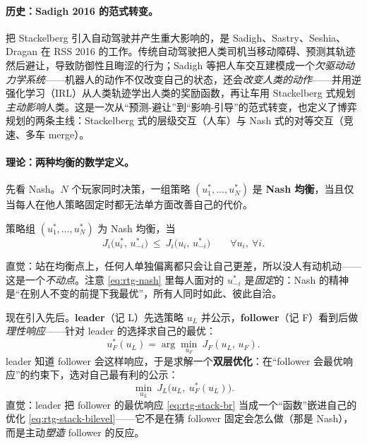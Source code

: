 \paragraph{历史：Sadigh 2016 的范式转变。}
把 Stackelberg 引入自动驾驶并产生重大影响的，是 Sadigh、Sastry、Seshia、Dragan 在 RSS 2016 的工作\cite{sadigh2016planning}。传统自动驾驶把人类司机当移动障碍、预测其轨迹然后避让，导致防御性且晦涩的行为；Sadigh 等把人车交互建模成一个\emph{欠驱动动力学系统}——机器人的动作不仅改变自己的状态，还会\emph{改变人类的动作}——并用逆强化学习（IRL）从人类轨迹学出人类的奖励函数，再让车用 Stackelberg 式规划\emph{主动影响}人类。这是一次从“预测-避让”到“影响-引导”的范式转变，也定义了博弈规划的两条主线：Stackelberg 式的层级交互（人车）与 Nash 式的对等交互（竞速、多车 merge）。

\paragraph{理论：两种均衡的数学定义。}
先看 Nash。$N$ 个玩家同时决策，一组策略 $(u_1^*,\dots,u_N^*)$ 是 \textbf{Nash 均衡}，当且仅当每人在他人策略固定时都无法单方面改善自己的代价。

\begin{definition}[Nash 均衡]\label{def:rtg-nash}
策略组 $(u_1^*,\dots,u_N^*)$ 为 Nash 均衡，当
\begin{equation}
  J_i\big(u_i^*,\,u_{-i}^*\big)\ \le\ J_i\big(u_i,\,u_{-i}^*\big)\qquad\forall u_i,\ \forall i.
  \label{eq:rtg-nash}
\end{equation}
\end{definition}

\noindent 直觉：站在均衡点上，任何人单独偏离都只会让自己更差，所以没人有动机动——这是一个\emph{不动点}\cite{sadigh2016planning}。注意 \cref{eq:rtg-nash} 里每人面对的 $u_{-i}^*$ 是\emph{固定}的：Nash 的精神是“在别人不变的前提下我最优”，所有人同时如此、彼此自洽。

现在引入先后。\textbf{leader}（记 L）先选策略 $u_L$ 并公示，\textbf{follower}（记 F）看到后做\emph{理性响应}——针对 leader 的选择求自己的最优：
\begin{equation}
  u_F^*(u_L)=\arg\min_{u_F}\ J_F(u_L,\,u_F).
  \label{eq:rtg-stack-br}
\end{equation}
leader 知道 follower 会这样响应，于是求解一个\textbf{双层优化}：在“follower 会最优响应”的约束下，选对自己最有利的公示：
\begin{equation}
  \min_{u_L}\ J_L\big(u_L,\ u_F^*(u_L)\big).
  \label{eq:rtg-stack-bilevel}
\end{equation}
直觉：leader 把 follower 的最优响应 \cref{eq:rtg-stack-br} 当成一个“函数”嵌进自己的优化 \cref{eq:rtg-stack-bilevel}——它不是在猜 follower 固定会怎么做（那是 Nash），而是主动\emph{塑造} follower 的反应。

